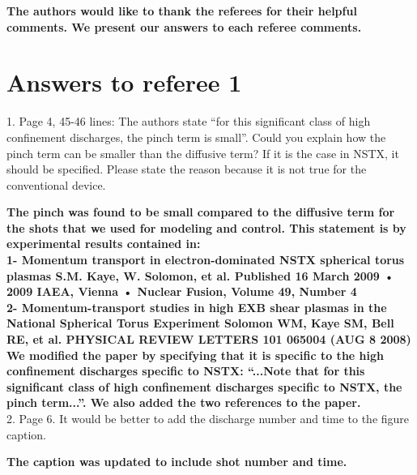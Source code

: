 \documentclass{scrartcl}
\newcommand{\response}[1]{\textcolor{red!80!black}{\bf #1}}
\begin{document}
\response{The authors would like to thank the referees for their helpful comments.
We present our answers to each referee comments.}
\section{Answers to referee 1}

1. Page 4, 45-46 lines: The authors state “for this significant class of high confinement discharges, the pinch term is small”. Could you explain how the pinch term can be smaller than the diffusive term? If it is the case in NSTX, it should be specified. Please state the reason because it is not true for the conventional device.

\response{The pinch was found to be small compared to the diffusive term for the shots that we used for modeling and control.
This statement is by experimental results contained in:  \\
1- Momentum transport in electron-dominated NSTX spherical torus plasmas
S.M. Kaye, W. Solomon,  et al. Published 16 March 2009 • 2009 IAEA, Vienna • Nuclear Fusion, Volume 49, Number 4\\
2- Momentum-transport studies in high EXB shear plasmas in the National Spherical Torus Experiment 
Solomon WM, Kaye SM, Bell RE, et al. 
PHYSICAL REVIEW LETTERS 101 065004 (AUG 8 2008)\\
We modified the paper by specifying that it is specific to the high confinement discharges specific to NSTX:   ``...Note that for this significant class of high confinement discharges specific to NSTX, the pinch term...''.
We also added the two references to the paper.}\\

2. Page 6. It would be better to add the discharge number and time to the figure caption.

\response{The caption was updated to include shot number and time.} \\
\end{document}
